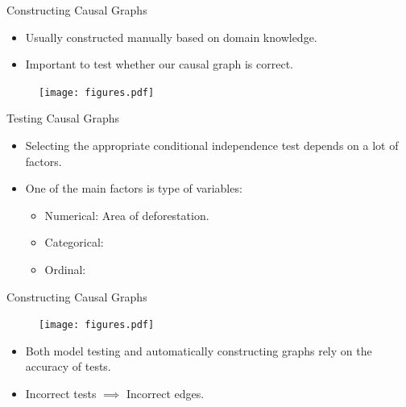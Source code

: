 \documentclass[aspectratio=169]{beamer}
\begin{document}
\begin{frame}{Constructing Causal Graphs}

\vspace{2em}

\begin{itemize}
	\item Usually constructed manually based on domain knowledge.
	\item Important to test whether our causal graph is correct.
\end{itemize}

\vspace{1em}

\begin{figure}
	\center
	\texttt{[image: figures.pdf]}
\end{figure}
	
\end{frame}

\begin{frame}{Testing Causal Graphs}
	\begin{itemize}
		\item Selecting the appropriate conditional independence test depends on a
	lot of factors.
		\item One of the main factors is type of variables:
			\begin{itemize}
				\item Numerical: Area of deforestation.
				\item Categorical: 
				\item Ordinal:
			\end{itemize}
	\end{itemize}

	\vspace{2em}
		
\end{frame}

\begin{frame}{Constructing Causal Graphs}
	\begin{figure}
		\center
		\texttt{[image: figures.pdf]}
	\end{figure}

	\begin{itemize}
		\item Both model testing and automatically constructing graphs rely on the accuracy of tests.
		\item Incorrect tests $ \implies $ Incorrect edges.
	\end{itemize}

	\vspace{0.5em}
	
\end{frame}
\end{document}
